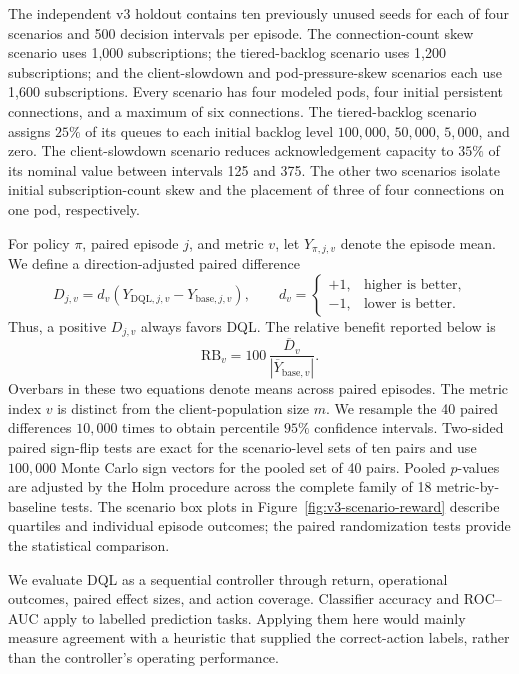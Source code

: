 The independent v3 holdout contains ten previously unused seeds for each of
four scenarios and 500 decision intervals per episode.  The connection-count
skew scenario uses 1,000 subscriptions; the tiered-backlog scenario uses 1,200
subscriptions; and the client-slowdown and pod-pressure-skew scenarios each use
1,600 subscriptions.  Every scenario has four modeled pods, four initial
persistent connections, and a maximum of six connections.  The tiered-backlog
scenario assigns $25\%$ of its queues to each initial backlog level
$100{,}000$, $50{,}000$, $5{,}000$, and zero.  The client-slowdown scenario
reduces acknowledgement capacity to $35\%$ of its nominal value between
intervals 125 and 375.  The other two scenarios isolate initial
subscription-count skew and the placement of three of four connections on one
pod, respectively.

For policy $\pi$, paired episode $j$, and metric $v$, let
$Y_{\pi,j,v}$ denote the episode mean.  We define a direction-adjusted paired
difference
\begin{equation}
  D_{j,v}=d_v\left(Y_{\mathrm{DQL},j,v}
  -Y_{\mathrm{base},j,v}\right),
  \qquad
  d_v=\begin{cases}
  +1,&\text{higher is better},\\
  -1,&\text{lower is better}.
  \end{cases}
  \label{eq:direction-adjusted-effect}
\end{equation}
Thus, a positive $D_{j,v}$ always favors DQL.  The relative benefit reported
below is
\begin{equation}
  \mathrm{RB}_v=100\,
  \frac{\overline{D}_v}{\left|\overline{Y}_{\mathrm{base},v}\right|}.
  \label{eq:relative-benefit}
\end{equation}
Overbars in these two equations denote means across paired episodes.
The metric index $v$ is distinct from the client-population size $m$.
We resample the 40 paired differences $10{,}000$ times to obtain percentile
$95\%$ confidence intervals.  Two-sided paired sign-flip tests are exact for
the scenario-level sets of ten pairs and use $100{,}000$ Monte Carlo sign
vectors for the pooled set of 40 pairs.  Pooled $p$-values are adjusted by the
Holm procedure across the complete family of 18 metric-by-baseline tests.  The
scenario box plots in Figure~\ref{fig:v3-scenario-reward} describe quartiles
and individual episode outcomes; the paired randomization tests
provide the statistical comparison.

We evaluate DQL as a sequential controller through return, operational
outcomes, paired effect sizes, and action coverage. Classifier accuracy and
ROC--AUC apply to labelled prediction tasks. Applying them here would mainly
measure agreement with a heuristic that supplied the correct-action labels,
rather than the controller's operating performance.

